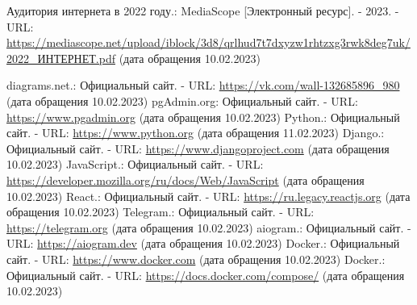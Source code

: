 \documentclass[14pt]{extreport}
\begin{document}
\pagestyle{empty} %

\pagestyle{plain} %

\tableofcontents



    







        

% 
% 

\newpage
    \begin{thebibliography}{99}
         Аудитория интернета в 2022 году.: %
        MediaScope [Электронный ресурс]. - 2023. - URL: %
        \url{https://mediascope.net/upload/iblock/3d8/qrlhud7t7dxyzw1rhtzxg3rwk8deg7uk/2022_ИНТЕРНЕТ.pdf} %
        (дата обращения 10.02.2023)

         diagrams.net.: Официальный сайт. - %
        URL: \url{https://vk.com/wall-132685896_980} (дата обращения 10.02.2023)
         pgAdmin.org: Официальный сайт. - %
        URL: \url{https://www.pgadmin.org} (дата обращения 10.02.2023)
         Python.: Официальный сайт. - %
        URL: \url{https://www.python.org} (дата обращения 11.02.2023)
         Django.: Официальный сайт. - %
        URL: \url{https://www.djangoproject.com} (дата обращения 10.02.2023)
         JavaScript.: Официальный сайт. - %
        URL: \url{https://developer.mozilla.org/ru/docs/Web/JavaScript} (дата обращения 10.02.2023)
         React.: Официальный сайт. - %
        URL: \url{https://ru.legacy.reactjs.org} (дата обращения 10.02.2023) 
         Telegram.: Официальный сайт. - %
        URL: \url{https://telegram.org} (дата обращения 10.02.2023) 
         aiogram.: Официальный сайт. - %
        URL: \url{https://aiogram.dev} (дата обращения 10.02.2023) 
         Docker.: Официальный сайт. - %
        URL: \url{https://www.docker.com} (дата обращения 10.02.2023) 
         Docker.: Официальный сайт. - %
        URL: \url{https://docs.docker.com/compose/} (дата обращения 10.02.2023) 
        
    \end{thebibliography}
\end{document}
